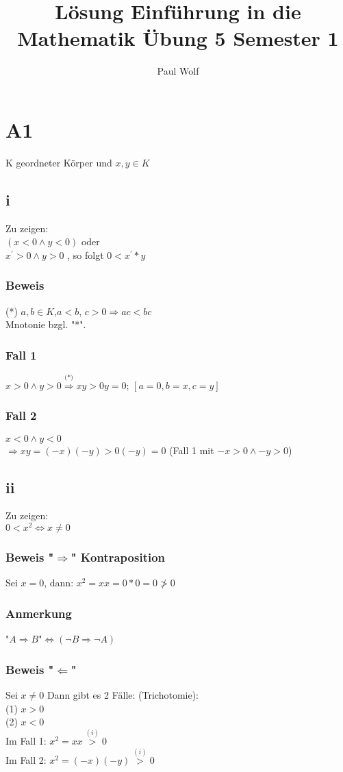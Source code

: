 \documentclass[11pt]{scrartcl}
\title{Lösung Einführung in die Mathematik Übung 5 Semester 1}
\author{Paul Wolf}
\begin{document}
\maketitle
\tableofcontents

\section{A1}
K geordneter Körper und $x,y \in K$ \\
\subsection{i}
Zu zeigen: \\
$(x < 0 \land y < 0)$ oder \\
$x^{'} > 0 \land y > 0$ , so folgt  $0 < x^{'} *y$
\subsubsection*{Beweis}
(*) $a,b \in K$,$a < b$, $c > 0 \Rightarrow ac < bc$ \\
Mnotonie bzgl. "*".
\subsubsection*{Fall 1}
$x > 0 \land y > 0 \overset{\text{(*)}}{\Rightarrow} xy > 0y = 0$; $[a=0,b=x,c=y]$
\subsubsection*{Fall 2}
$x < 0 \land y < 0 $\\
$\Rightarrow xy = (-x)(-y) > 0(-y) =0$ (Fall 1 mit $-x > 0 \land -y > 0$)
\subsection{ii}
Zu zeigen: \\
$0 < x^2 \iff x \neq 0$
\subsubsection*{Beweis "$\Rightarrow$" Kontraposition}
Sei $x=0$, dann: $x^2 = xx =0*0=0 \ngtr 0$
\subsubsection*{Anmerkung}
"$A \Rightarrow B$"$\iff (\neg B \Rightarrow \neg A )$

\subsubsection*{Beweis "$\Leftarrow$"}
Sei $x \neq 0$ Dann gibt es 2 Fälle: (Trichotomie): \\
(1) $x > 0$ \\
(2) $x < 0$ \\
Im Fall 1: $x^2 = xx \overset{(i)}{>} 0 $ \\
Im Fall 2: $x^2 = (-x)(-y) \overset{(i)}{>} 0$
\end{document}
